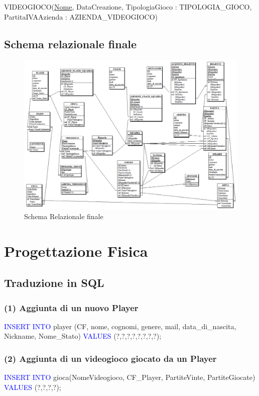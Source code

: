 \documentclass[a4paper,12pt]{report}
\begin{document}
\noindent VIDEOGIOCO(\underline{Nome}, DataCreazione, TipologiaGioco : TIPOLOGIA\_GIOCO, PartitaIVAAzienda : AZIENDA\_VIDEOGIOCO) \\







\section{Schema relazionale finale}


\begin{figure}[!htb]
	\centerline{\includegraphics[scale=0.6]{img/SchemaRelazionale.png}}
	\caption{Schema Relazionale finale}
	\label{img:Schema_Relazionale}
\end{figure}

\chapter{Progettazione Fisica}
\section{Traduzione in SQL}
\subsection*{(1) Aggiunta di un nuovo Player}
\textcolor{blue}{INSERT INTO} player (CF, nome, cognomi, genere, mail, data\_di\_nascita, Nickname, Nome\_Stato)
\textcolor{blue}{VALUES} (?,?,?,?,?,?,?,?);

\subsection*{(2) Aggiunta di un videogioco giocato da un Player}
\textcolor{blue}{INSERT INTO} gioca(NomeVideogioco, CF\_Player, PartiteVinte, PartiteGiocate)
\textcolor{blue}{VALUES} (?,?,?,?);
\end{document}
